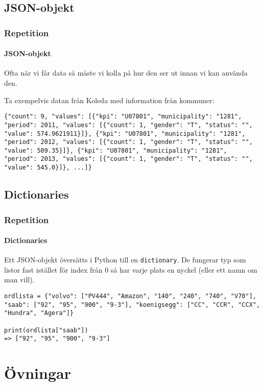 \documentclass[aspectratio=169]{beamer}
\begin{document}
\subsection{JSON-objekt}

\begin{frame}[fragile]
\frametitle{Repetition}
\framesubtitle{JSON-objekt}

Ofta när vi får data så måste vi kolla på hur den ser ut innan vi kan använda den.

Ta exempelvis datan från Koleda med information från kommuner:

\begin{lstlisting}
{"count": 9, "values": [{"kpi": "U07801", "municipality": "1281", "period": 2011, "values": [{"count": 1, "gender": "T", "status": "", "value": 574.9621911}]}, {"kpi": "U07801", "municipality": "1281", "period": 2012, "values": [{"count": 1, "gender": "T", "status": "", "value": 509.35}]}, {"kpi": "U07801", "municipality": "1281", "period": 2013, "values": [{"count": 1, "gender": "T", "status": "", "value": 545.0}]}, ...]}
\end{lstlisting}

\end{frame}

\subsection{Dictionaries}

\begin{frame}[fragile]
\frametitle{Repetition}
\framesubtitle{Dictionaries}

Ett JSON-objekt översätts i Python till en \texttt{dictionary}. De fungerar typ som listor fast istället för index från 0 så har varje plats en nyckel (eller ett namn om man vill).

\begin{lstlisting}
ordlista = {"volvo": ["PV444", "Amazon", "140", "240", "740", "V70"], "saab": ["92", "95", "900", "9-3"], "koenigsegg": ["CC", "CCR", "CCX", "Hundra", "Agera"]}

print(ordlista["saab"])
=> ["92", "95", "900", "9-3"]
\end{lstlisting}

\end{frame}

\section{Övningar}
\end{document}
